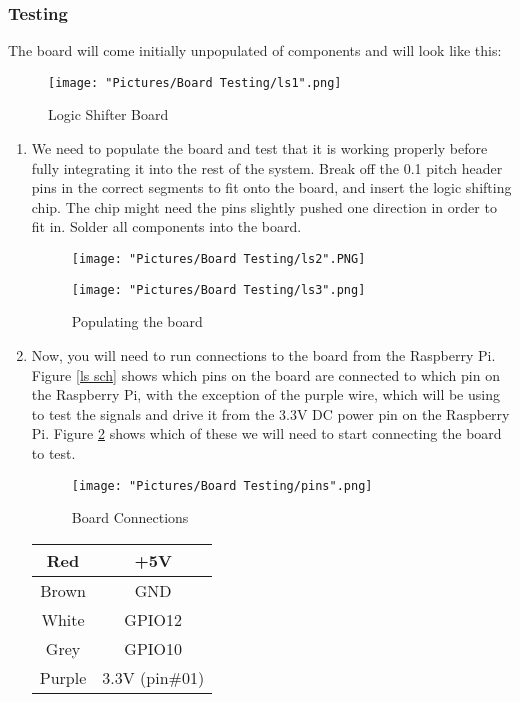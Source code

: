 \documentclass[12pt]{article}
\begin{document}
\subsubsection{Testing}

The board will come initially unpopulated of components and will look like this:

\begin{figure}[H]
  	\centering
    	\texttt{[image: "Pictures/Board Testing/ls1".png]}
 	\caption{Logic Shifter Board}
	\label{ls1}
\end{figure}

\begin{enumerate}

	\item We need to populate the board and test that it is working properly before fully integrating it into the rest of the system. Break off the 0.1 pitch header pins in the correct segments to fit onto the board, and insert the logic shifting chip. The chip might need the pins slightly pushed one direction in order to fit in. Solder all components into the board.

\begin{figure}[H]
 	\centering
  	\begin{minipage}[b]{0.45\textwidth}
		\texttt{[image: "Pictures/Board Testing/ls2".PNG]}
  	\end{minipage}
  	\hfill
  	\begin{minipage}[b]{0.45\textwidth}
    		\texttt{[image: "Pictures/Board Testing/ls3".png]}
  	\end{minipage}
	\caption{Populating the board}
\end{figure}

	\item Now, you will need to run connections to the board from the Raspberry Pi. Figure \ref{ls sch} shows which pins on the board are connected to which pin on the Raspberry Pi, with the exception of the purple wire, which will be using to test the signals and drive it from the 3.3V DC power pin on the Raspberry Pi. Figure \ref{ls4} shows which of these we will need to start connecting the board to test.

\begin{figure}[H]
  	\centering
    	\texttt{[image: "Pictures/Board Testing/pins".png]}
 	\caption{Board Connections}
	\label{ls4}
\end{figure}

\begin{center}
\begin{tabular}[2]{| c | c |}	
	\hline
	Red & +5V \\ \hline
	Brown & GND \\ \hline
	White & GPIO12 \\ \hline
	Grey & GPIO10 \\ \hline
	Purple & 3.3V (pin\#01) \\ \hline
\end{tabular}	
\end{center}


\end{enumerate}
\end{document}

